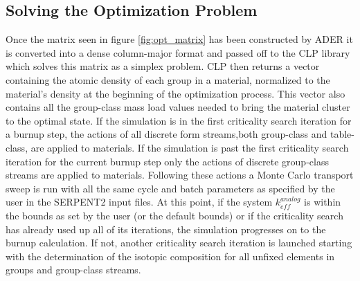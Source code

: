 \subsection{Solving the Optimization Problem}\label{ssec:clp}
Once the matrix seen in figure \ref{fig:opt_matrix} has been constructed by ADER
it is converted into a dense column-major format and passed off to the CLP 
library which solves this matrix as a simplex problem. CLP then returns a
vector containing the atomic density of each group in a material, normalized to
the material's density at the beginning of the optimization process. This
vector also contains all the group-class mass load values needed to bring
the material cluster to the optimal state. If the simulation is in the first
criticality search iteration for a burnup step, the actions of all discrete 
form streams,both group-class and table-class, are applied to materials. If the
simulation is past the first criticality search iteration for the current
burnup step only the actions of discrete group-class streams are applied to
materials. Following these actions a Monte Carlo transport sweep is run with
all the same cycle and batch parameters as specified by the user in the
SERPENT2 input files. At this point, if the system $k_{eff}^{analog}$ is within
the bounds as set by the user (or the default bounds) or if the criticality
search has already used up all of its iterations, the simulation progresses
on to the burnup calculation. If not, another criticality search iteration is
launched starting with the determination of the isotopic composition for
all unfixed elements in groups and group-class streams.

